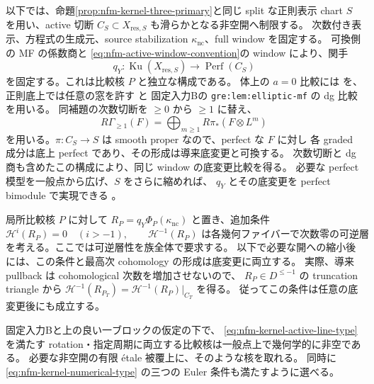 以下では、命題\ref{prop:nfm-kernel-three-primary}と同じ
split な正則表示 chart $S$ を用い、active 切断
$C_S\subset X_{\mathrm{res},S}$ も滑らかとなる非空開へ制限する。
次数付き表示、方程式の生成元、source stabilization
$\kappa_{\mathrm{nc}}$、full window を固定する。
可換側の MF の係数商と
\eqref{eq:nfm-active-window-convention}の window により、関手
\[
 q_Y:\operatorname{Ku}(X_{\mathrm{res},S})
       \longrightarrow\operatorname{Perf}(C_S)
\]
を固定する。これは比較核 $P$ と独立な構成である。
体上の $a=0$ 比較には
\cite[Theorem~2.5(iii)]{NFMOrlovSingularities}を、
正則底上では任意の窓を許す
\cite[Theorem~6.4(3)]{NFMBurkeStevenson}と
固定入力Bの \texttt{gre:lem:elliptic-mf} の dg 比較を用いる。
同補題の次数切断を $\ge0$ から $\ge1$ に替え、
\[
 R\Gamma_{\ge1}(F)=
 \bigoplus_{m\ge1}R\pi_*(F\otimes L^m)
\]
を用いる。$\pi:C_S\to S$ は smooth proper なので、perfect な $F$ に対し
各 graded 成分は底上 perfect であり、その形成は導来底変更と可換する。
次数切断と dg 商も含めたこの構成により、同じ window の底変更比較を得る。
必要な perfect 模型を一般点から広げ、$S$ をさらに縮めれば、
$q_Y$ とその底変更を perfect bimodule で実現できる
\cite[Lemmas~2.8, 2.10]{NFMToenVaquieModuli}。

局所比較核 $P$ に対して
$R_P=q_Y\Phi_P(\kappa_{\mathrm{nc}})$ と置き、追加条件
\begin{equation}
\label{eq:nfm-kernel-active-line-type}
 \mathcal H^i(R_P)=0\quad(i>-1),\qquad
 \mathcal H^{-1}(R_P)
 \text{ は各幾何ファイバーで次数零の可逆層}
\end{equation}
を考える。ここでは可逆層性を族全体で要求する。
以下で必要な開への縮小後には、この条件と最高次 cohomology の形成は底変更に両立する。
実際、導来 pullback は cohomological 次数を増加させないので、
$R_P\in D^{\le-1}$ の truncation triangle から
$\mathcal H^{-1}(R_{P_T})=\mathcal H^{-1}(R_P)|_{C_T}$ を得る。
従ってこの条件は任意の底変更後にも成立する。

\begin{proposition}[最高次が線束となる型の非空性]
\label{prop:nfm-kernel-active-line-nonempty}
固定入力Bと上の良い一ブロックの仮定の下で、
\eqref{eq:nfm-kernel-active-line-type}を満たす
rotation・指定周期に両立する比較核は一般点上で幾何学的に非空である。
必要な非空開の有限 étale 被覆上に、そのような核を取れる。
同時に \eqref{eq:nfm-kernel-numerical-type} の三つの Euler 条件も満たすように選べる。
\end{proposition}

